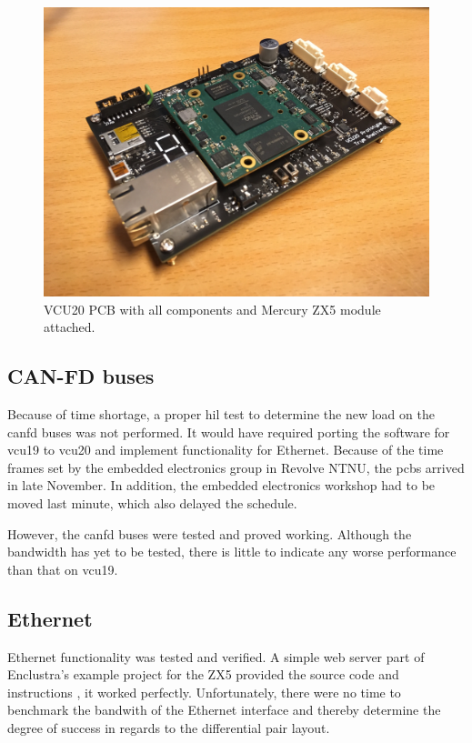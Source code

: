 \begin{figure}[H]
    \centering
    \includegraphics[width=.85\textwidth]{media/vcu20.JPG}
    \caption{VCU20 PCB with all components and Mercury ZX5 module attached.}
    \label{fig:vcu20_soldered}
\end{figure}

\subsection{CAN-FD buses}

Because of time shortage, a proper \acrfull{hil} test to determine the new load on the \acrshort{canfd} buses was not performed. It would have required porting the software for \acrshort{vcu19} to \acrshort{vcu20} and implement functionality for Ethernet. Because of the time frames set by the embedded electronics group in Revolve NTNU, the \acrshort{pcb}s arrived in late November. In addition, the embedded electronics workshop had to be moved last minute, which also delayed the schedule.  

However, the \acrshort{canfd} buses were tested and proved working. Although the bandwidth has yet to be tested, there is little to indicate any worse performance than that on \acrshort{vcu19}.

\subsection{Ethernet}

Ethernet functionality was tested and verified. A simple web server part of Enclustra's example project for the ZX5 provided the source code and instructions \cite{zx5_ex}, it worked perfectly. Unfortunately, there were no time to benchmark the bandwith of the Ethernet interface and thereby determine the degree of success in regards to the differential pair layout. 

